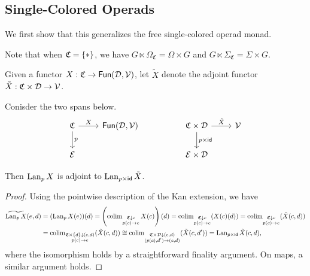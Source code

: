 \documentclass[a4paper,10pt
,draft
]{article}%
\renewcommand{\1}{\ensuremath{\mathbb{id}}}
\begin{document}
\subsection{Single-Colored Operads}
We first show that this generalizes the free single-colored operad monad.

Note that when $\mathfrak C = \set{\**}$, we have
$G \ltimes \Omega_{\mathfrak C} = \Omega \times G$ and 
$G \ltimes \Sigma_{\mathfrak C} = \Sigma \times G$.

\begin{notation}
      Given a functor $X : \mathfrak C \to \mathsf{Fun}(\mathcal D, \mathcal V)$,
      let $\tilde X$ denote the adjoint functor $\tilde X: \mathfrak C \times \mathcal D \to \mathcal V$.
\end{notation}

\begin{lemma}
      \label{SPAN_LAN_LEM}
      Conisder the two spans below.
      \begin{equation}
            \begin{tikzcd}
                  \C \arrow[d, "p"] \arrow[r, "X"]
                  &
                  \mathsf{Fun}(\mathcal D, \V)
                  &&
                  \C \times \mathcal D \arrow[d, "p \times \mathsf{id}"] \arrow[r, "\tilde X"]
                  &
                  \V
                  \\
                  \mathcal E
                  &
                  &&
                  \mathcal E \times \mathcal D
            \end{tikzcd}
      \end{equation}
      
      Then $\operatorname{Lan}_p X$ is adjoint to $\operatorname{Lan}_{p \times \mathsf{id}} \tilde X$. 
\end{lemma}
\begin{proof}
      Using the pointwise description of the Kan extension, we have
      \begin{align}
        \widetilde{\operatorname{Lan}_p X}(e,d)
        &= (\operatorname{Lan}_p X(e))(d)
          = \left(
          \operatorname{colim}\limits_{\substack{ \mathfrak C \downarrow e \\ p(c) \to e}} X(c)
        \right)(d)
        = \operatorname{colim}\limits_{\substack{ \mathfrak C \downarrow e \\ p(c) \to e}}(X(c)(d))
        = \operatorname{colim}\limits_{\substack{ \mathfrak C \downarrow e \\ p(c) \to e}}(\tilde X(c,d))\\
        &= \operatorname{colim}\limits_{\substack{ \mathfrak C \times \left\{d\right\} \downarrow (e,d) \\ p(c) \to e}}(\tilde X(c,d))
        \cong \operatorname{colim}\limits_{\substack{ \mathfrak C \times \mathcal D \downarrow (e,d) \\ (p(c),d') \to (e,d)}}(\tilde X(c,d'))
        = \operatorname{Lan}_{p \times \mathsf{id}}\tilde X(c,d),
      \end{align}
      where the isomorphism holds by a straightforward finality argument.
      On maps, a similar argument holds.
\end{proof}
\end{document}
